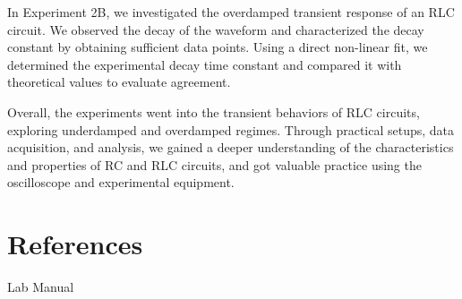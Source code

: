 \documentclass[11pt]{article}
\let\oldsection\section
\renewcommand\section{\clearpage\oldsection}
\begin{document}
    In Experiment 2B, we investigated the overdamped transient response of an RLC circuit. We observed the decay of the waveform and characterized the decay constant by obtaining sufficient data points. Using a direct non-linear fit, we determined the experimental decay time constant and compared it with theoretical values to evaluate agreement.

    Overall, the experiments went into the transient behaviors of RLC circuits, exploring underdamped and overdamped regimes. Through practical setups, data acquisition, and analysis, we gained a deeper understanding of the characteristics and properties of RC and RLC circuits, and got valuable practice using the oscilloscope and experimental equipment.



    \appendix
    \section{References}\label{sec:references}

    Lab Manual
\end{document}
